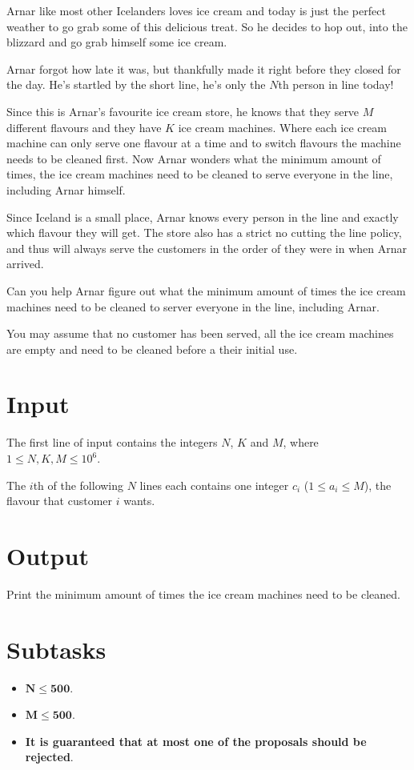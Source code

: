 Arnar like most other Icelanders loves ice cream and today is just the perfect
weather to go grab some of this delicious treat. So he decides to hop out, into
the blizzard and go grab himself some ice cream.

Arnar forgot how late it was, but thankfully made it right before they closed
for the day. He's startled by the short line, he's only the $N$th person in
line today!

Since this is Arnar's favourite ice cream store, he knows that they serve $M$
different flavours and they have $K$ ice cream machines.
Where each ice cream machine can only serve one flavour at a time and to switch
flavours the machine needs to be cleaned first.
Now Arnar wonders what the minimum amount of times, the ice cream machines
need to be cleaned to serve everyone in the line, including Arnar himself.

Since Iceland is a small place, Arnar knows every person in the line and exactly
which flavour they will get.
The store also has a strict no cutting the line policy, and thus will always serve
the customers in the order of they were in when Arnar arrived.

Can you help Arnar figure out what the minimum amount of times the ice cream
machines need to be cleaned to server everyone in the line, including Arnar.

You may assume that no customer has been served, all the ice cream machines
are empty and need to be cleaned before a their initial use.

\section*{Input}
The first line of input contains the integers $N$, $K$ and $M$, where $1 \leq
N, K, M \leq 10^6$.

The $i$th of the following $N$ lines each contains one integer $c_i$
($1 \leq a_i \leq M$), the flavour that customer $i$ wants.

\section*{Output}
Print the minimum amount of times the ice cream machines need to be cleaned.

\section*{Subtasks}
\begin{itemize}
    \item $\mathbf{N} \mathbf{\leq} \mathbf{500}$.
    \item $\mathbf{M} \mathbf{\leq} \mathbf{500}$.
    \item \textbf{It is guaranteed that at most one of the proposals should be
    rejected}.
\end{itemize}

